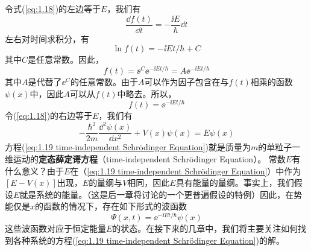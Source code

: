 	令式(\ref{eq:1.18})的左边等于$E$，我们有
	\begin{equation*}
		\frac{\dd f\left(t\right)}{\dd t}=-\frac{\ii E}{\hbar}\dd t
	\end{equation*}
	左右对时间求积分，有
	\begin{equation*}
		\ln f\left(t\right)= - \ii Et/\hbar+C
	\end{equation*}
	其中$C$是任意常数。因此，
	\begin{equation*}
		f\left(t\right)=\ee^C\ee^{-\ii Et/\hbar}=A\ee^{-\ii Et/\hbar}
	\end{equation*}
	其中$A$是代替了$\ee^C$的任意常数。由于$A$可以作为因子包含在与$f\left(t\right)$相乘的函数$\psi\left(x\right)$中，因此$A$可以从$f\left(t\right)$中略去。所以，
	\begin{equation*}
		f\left(t\right)=\ee^{-\ii Et/\hbar}
	\end{equation*}
	\indent 令(\ref{eq:1.18})的右边等于$E$，我们有
	\begin{equation}
		\boxed{-\frac{\hbar^2}{2m}\frac{\dd ^2\psi\left(x\right)}{\dd x^2}+V\left(x\right)\psi\left(x\right)=E\psi\left(x\right)}
		\label{eq:1.19 time-independent Schrödinger Equation}
	\end{equation}
	方程(\ref{eq:1.19 time-independent Schrödinger Equation})就是质量为$m$的单粒子一维运动的\textbf{定态薛定谔方程}（time-independent Schrödinger Equation）。	常数$E$有什么意义？由于$E$在（\ref{eq:1.19 time-independent Schrödinger Equation}）中作为$\left[E-V\left(x\right)\right]$出现，$E$的量纲与$V$相同，因此$E$具有能量的量纲。事实上，我们假设$E$就是系统的能量。（这是后一章将讨论的一个更普遍假设的特例）因此，在势能仅是$x$的函数的情况下，存在如下形式的波函数
	\begin{equation}
		\Psi\left(x,t\right)=\ee^{-\ii Et/\hbar}\psi\left(x\right)
		\label{eq:1.20}
	\end{equation}
	这些波函数对应于恒定能量$E$的状态。在接下来的几章中，我们将主要关注如何找到各种系统的方程(\ref{eq:1.19 time-independent Schrödinger Equation})的解。

